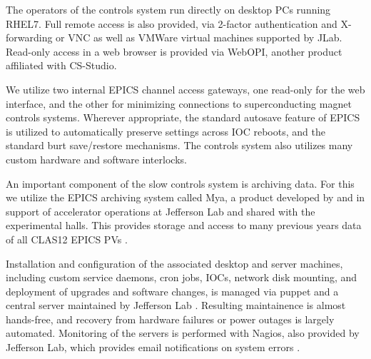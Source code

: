 The operators of the controls system run directly on desktop PCs running RHEL7.  Full remote access is also provided, via 2-factor authentication and X-forwarding or VNC as well as VMWare virtual machines supported by JLab.  Read-only access in a web browser is provided via WebOPI, another product affiliated with CS-Studio.

We utilize two internal EPICS channel access gateways, one read-only for the web interface, and the other for minimizing connections to superconducting magnet controls systems.  Wherever appropriate, the standard autosave feature of EPICS is utilized to automatically preserve settings across IOC reboots, and the standard burt save/restore mechanisms.  The controls system also utilizes many custom hardware and software interlocks.

An important component of the slow controls system is archiving data.  For this we utilize the EPICS archiving system called Mya, a product developed by and in support of accelerator operations at Jefferson Lab and shared with the experimental halls.  This provides storage and access to many previous years data of all CLAS12 EPICS PVs \cite{mya}.

Installation and configuration of the associated desktop and server machines, including custom service daemons, cron jobs, IOCs, network disk mounting, and deployment of upgrades and software changes, is managed via puppet and a central server maintained by Jefferson Lab \cite{puppet-website}.  Resulting maintainence is almost hands-free, and recovery from hardware failures or power outages is largely automated.  Monitoring of the servers is performed with Nagios, also provided by Jefferson Lab, which provides email notifications on system errors \cite{nagios-website}.

